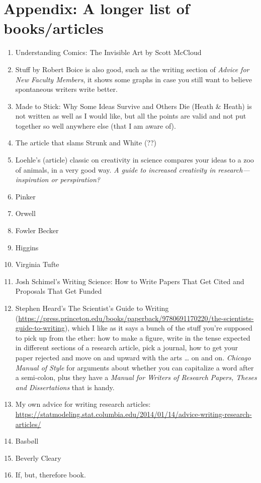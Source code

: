 \documentclass[11pt,letter]{article}
\begin{document}
\newpage
\section{Appendix: A longer list of books/articles}

\begin{enumerate}
\item Understanding Comics: The Invisible Art by Scott McCloud 
\item  Stuff by Robert Boice is also good, such as the writing section of \emph{Advice for New Faculty Members}, it shows some graphs in case you still want to believe spontaneous writers write better.
\item Made to Stick: Why Some Ideas Survive and Others Die (Heath \& Heath) is not written as well as I would like, but all the points are valid and not put together so well anywhere else (that I am aware of).
\item The article that slams Strunk and White (??)
\item Loehle's (article) classic on creativity in science compares your ideas to a zoo of animals, in a very good way. \emph{A guide to increased creativity in research---inspiration or perspiration?}
\item Pinker
\item Orwell
\item Fowler
\tem Becker
\item Higgins
\item Virginia Tufte 
\item Josh Schimel's Writing Science: How to Write Papers That Get Cited and Proposals That Get Funded
\item Stephen Heard’s The Scientist’s Guide to Writing (\url{https://press.princeton.edu/books/paperback/9780691170220/the-scientists-guide-to-writing}), which I like as it says a bunch of the stuff you’re supposed to pick up from the ether: how to make a figure, write in the tense expected in different sections of a research article, pick a journal, how to get your paper rejected and move on and upward with the arts … on and on. 
\emph{Chicago Manual of Style} for arguments about whether you can capitalize a word after a semi-colon, plus they have a \emph{Manual for Writers of Research Papers, Theses and Dissertations} that is handy.
\item My own advice for writing research articles:  \url{https://statmodeling.stat.columbia.edu/2014/01/14/advice-writing-research-articles/}
\item Basbøll 
\item Beverly Cleary 
\item If, but, therefore book. 
\end{enumerate}
\end{document}
